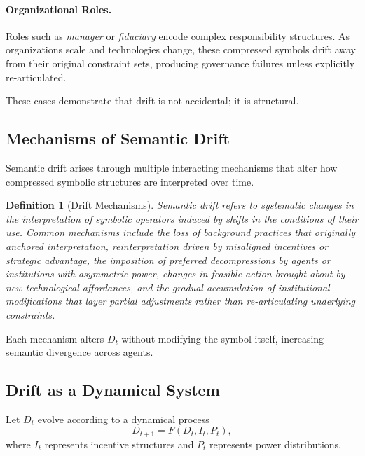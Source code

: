 \documentclass[11pt]{article}
\newtheorem{definition}{Definition}
\begin{document}
\paragraph{Organizational Roles.}
Roles such as \emph{manager} or \emph{fiduciary} encode complex responsibility
structures. As organizations scale and technologies change, these compressed
symbols drift away from their original constraint sets, producing governance
failures unless explicitly re-articulated.

These cases demonstrate that drift is not accidental; it is structural.

\subsection{Mechanisms of Semantic Drift}

Semantic drift arises through multiple interacting mechanisms that alter how
compressed symbolic structures are interpreted over time.

\begin{definition}[Drift Mechanisms]
Semantic drift refers to systematic changes in the interpretation of symbolic
operators induced by shifts in the conditions of their use. Common mechanisms
include the loss of background practices that originally anchored interpretation,
reinterpretation driven by misaligned incentives or strategic advantage, the
imposition of preferred decompressions by agents or institutions with asymmetric
power, changes in feasible action brought about by new technological
affordances, and the gradual accumulation of institutional modifications that
layer partial adjustments rather than re-articulating underlying constraints.
\end{definition}


Each mechanism alters $D_t$ without modifying the symbol itself, increasing
semantic divergence across agents.

\subsection{Drift as a Dynamical System}

Let $D_t$ evolve according to a dynamical process
\[
D_{t+1} = F(D_t, I_t, P_t),
\]
where $I_t$ represents incentive structures and $P_t$ represents power
distributions.
\end{document}
